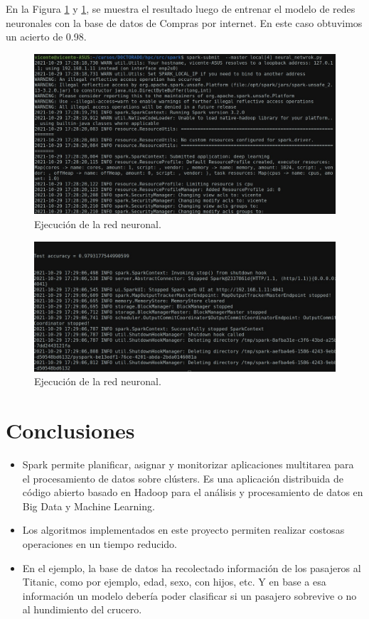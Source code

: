 \documentclass{article}
\begin{document}
En la Figura \ref{fig:spark_3} y \ref{fig:spark_3}, se muestra el resultado luego de entrenar el modelo de redes neuronales con la base de datos de Compras por internet. En este caso obtuvimos un acierto de 0.98.


\begin{figure}[H]
    \centering
    \includegraphics[width=15cm]{tareas/img/spark_3.jpg}
    \caption{Ejecución de la red neuronal.}
    \label{fig:spark_3}
\end{figure}

\begin{figure}[H]
    \centering
    \includegraphics[width=15cm]{tareas/img/spark_4.jpg}
    \caption{Ejecución de la red neuronal.}
    \label{fig:spark_4}
\end{figure}


\section{Conclusiones}

\begin{itemize}
    \item Spark permite planificar, asignar y monitorizar aplicaciones multitarea para el procesamiento de datos sobre clústers.  Es una aplicación distribuida de código abierto basado en Hadoop para el análisis y procesamiento de datos en Big Data y Machine Learning.
    \item Los algoritmos implementados en este proyecto permiten realizar costosas operaciones en un tiempo reducido. 
    \item En el ejemplo, la base de datos ha recolectado información de los pasajeros al Titanic, como por ejemplo, edad, sexo, con hijos, etc. Y en base a esa información un modelo debería poder clasificar si un pasajero sobrevive o no al hundimiento del crucero. 
\end{itemize}
 



%

\end{document}
